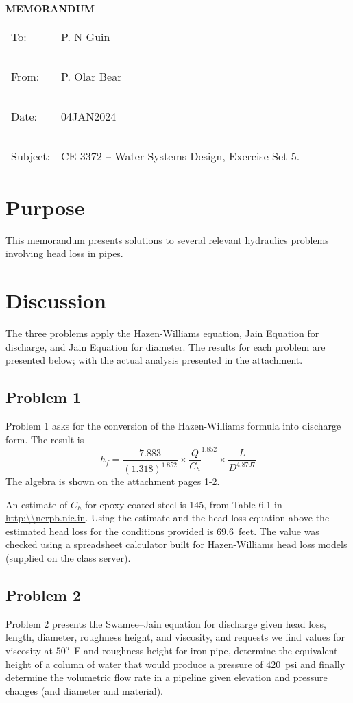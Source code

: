 \documentclass[12pt]{article}
\begin{document}
\begin{center}
\textbf{MEMORANDUM}
\end{center}
\begingroup
\begin{tabular}{p{1in} p{5in}}
To: & P. N Guin \\ ~\\
From: & P. Olar Bear \\ ~\\
Date: & 04JAN2024 \\ ~\\
Subject: & CE 3372 -- Water Systems Design, Exercise Set 5. ~\\

\end{tabular}
\endgroup
\section*{\small{Purpose}}  
This memorandum presents solutions to several relevant hydraulics problems involving head loss in pipes.  
\section*{\small{Discussion}}
The three problems apply the Hazen-Williams equation, Jain Equation for discharge, and Jain Equation for diameter.  
The results for each problem are presented below; with the actual analysis presented in the attachment.
\subsection*{\small{Problem 1}}
Problem 1 asks for the conversion of the Hazen-Williams formula into discharge form.  The result is
\begin{equation}
h_f = \frac{7.883}{(1.318)^{1.852}} \times \frac{Q}{C_h}^{1.852} \times \frac{L}{D^{4.8707}}
\end{equation}
The algebra is shown on the attachment pages 1-2.

An estimate of $C_h$ for epoxy-coated steel is 145, from Table 6.1 in  \url{http:\\ncrpb.nic.in}.  
Using the estimate and the head loss equation above the estimated head loss for the conditions provided is $69.6$~feet.
The value was checked using a spreadsheet calculator built for Hazen-Williams head loss models (supplied on the class server).

\subsection*{\small{Problem 2}}
Problem 2 presents the Swamee--Jain equation for discharge given head loss, length, diameter, roughness height, and viscosity, and requests we find values for viscosity at $50^o$~F and roughness height for iron pipe, determine the equivalent height of a column of water that would produce a pressure of $420$~psi and finally determine the volumetric flow rate in a pipeline given elevation and pressure changes (and diameter and material).
\end{document}

